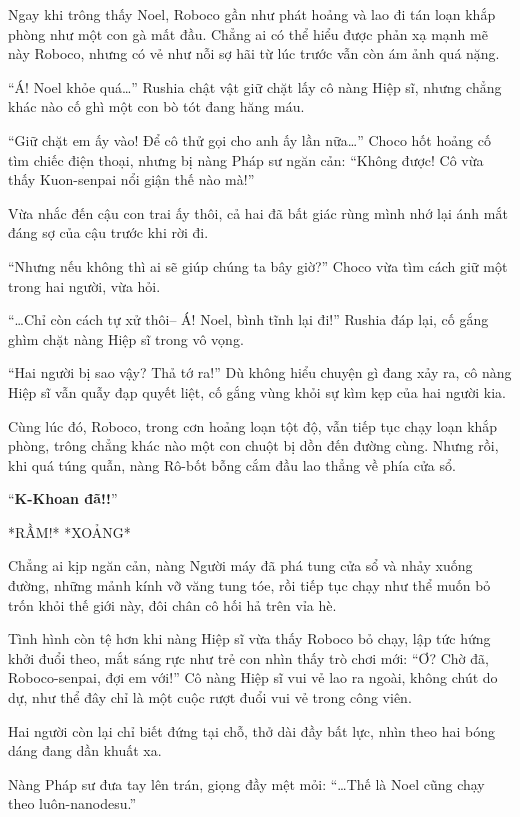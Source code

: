 \documentclass[../main.tex]{subfiles}
\begin{document}
Ngay khi trông thấy Noel, Roboco gần như phát hoảng và lao đi tán loạn khắp phòng như một con gà mất đầu. Chẳng ai có thể hiểu được phản xạ mạnh mẽ này Roboco, nhưng có vẻ như nỗi sợ hãi từ lúc trước vẫn còn ám ảnh quá nặng.

``Á! Noel khỏe quá\dots''  Rushia chật vật giữ chặt lấy cô nàng Hiệp sĩ, nhưng chẳng khác nào cố ghì một con bò tót đang hăng máu.

``Giữ chặt em ấy vào! Để cô thử gọi cho anh ấy lần nữa\dots'' Choco hốt hoảng cố tìm chiếc điện thoại, nhưng bị nàng Pháp sư ngăn cản: ``Không được! Cô vừa thấy Kuon-senpai nổi giận thế nào mà!''

Vừa nhắc đến cậu con trai ấy thôi, cả hai đã bất giác rùng mình nhớ lại ánh mắt đáng sợ của cậu trước khi rời đi.

``Nhưng nếu không thì ai sẽ giúp chúng ta bây giờ?'' Choco vừa tìm cách giữ một trong hai người, vừa hỏi.

``\dots Chỉ còn cách tự xử thôi-- Á! Noel, bình tĩnh lại đi!'' Rushia đáp lại, cố gắng ghìm chặt nàng Hiệp sĩ trong vô vọng.

``Hai người bị sao vậy? Thả tớ ra!'' Dù không hiểu chuyện gì đang xảy ra, cô nàng Hiệp sĩ vẫn quẫy đạp quyết liệt, cố gắng vùng khỏi sự kìm kẹp của hai người kia.

Cùng lúc đó, Roboco, trong cơn hoảng loạn tột độ, vẫn tiếp tục chạy loạn khắp phòng, trông chẳng khác nào một con chuột bị dồn đến đường cùng. Nhưng rồi, khi quá túng quẫn, nàng Rô-bốt bỗng cắm đầu lao thẳng về phía cửa sổ.


``\textbf{K-Khoan đã!!}''

*RẦM!* *XOẢNG*

Chẳng ai kịp ngăn cản, nàng Người máy đã phá tung cửa sổ và nhảy xuống đường, những mảnh kính vỡ văng tung tóe, rồi tiếp tục chạy như thể muốn bỏ trốn khỏi thế giới này, đôi chân cô hối hả trên vỉa hè.

Tình hình còn tệ hơn khi nàng Hiệp sĩ vừa thấy Roboco bỏ chạy, lập tức hứng khởi đuổi theo, mắt sáng rực như trẻ con nhìn thấy trò chơi mới: ``Ơ? Chờ đã, Roboco-senpai, đợi em với!'' Cô nàng Hiệp sĩ vui vẻ lao ra ngoài, không chút do dự, như thể đây chỉ là một cuộc rượt đuổi vui vẻ trong công viên.

Hai người còn lại chỉ biết đứng tại chỗ, thở dài đầy bất lực, nhìn theo hai bóng dáng đang dần khuất xa.

Nàng Pháp sư đưa tay lên trán, giọng đầy mệt mỏi: ``\dots Thế là Noel cũng chạy theo luôn-nanodesu.''
\end{document}
